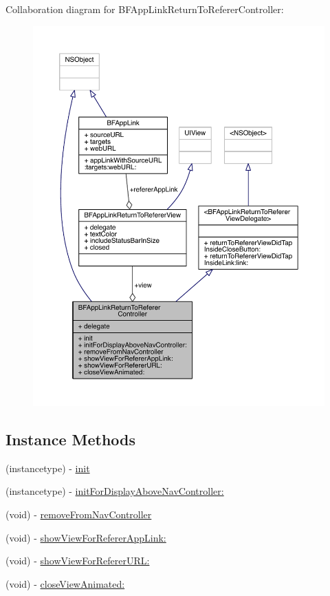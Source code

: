 Collaboration diagram for B\-F\-App\-Link\-Return\-To\-Referer\-Controller\-:
\nopagebreak
\begin{figure}[H]
\begin{center}
\leavevmode
\includegraphics[width=350pt]{interface_b_f_app_link_return_to_referer_controller__coll__graph}
\end{center}
\end{figure}
\subsection*{Instance Methods}
\begin{DoxyCompactItemize}
\item 
(instancetype) -\/ \hyperlink{interface_b_f_app_link_return_to_referer_controller_aad7c9269c66d2eebf43f7f0902637aef}{init}
\item 
(instancetype) -\/ \hyperlink{interface_b_f_app_link_return_to_referer_controller_a8c47ee3e77c4a013e2e1ddcbaaeff433}{init\-For\-Display\-Above\-Nav\-Controller\-:}
\item 
(void) -\/ \hyperlink{interface_b_f_app_link_return_to_referer_controller_a58def555983b403482863d69e5787723}{remove\-From\-Nav\-Controller}
\item 
(void) -\/ \hyperlink{interface_b_f_app_link_return_to_referer_controller_aef5b073fe512d2ac391c475474c1eca8}{show\-View\-For\-Referer\-App\-Link\-:}
\item 
(void) -\/ \hyperlink{interface_b_f_app_link_return_to_referer_controller_a27c95883e5afd41342073d803794beb7}{show\-View\-For\-Referer\-U\-R\-L\-:}
\item 
(void) -\/ \hyperlink{interface_b_f_app_link_return_to_referer_controller_a13a65ce4cf4dcf07abafea5e14541d2e}{close\-View\-Animated\-:}
\end{DoxyCompactItemize}
